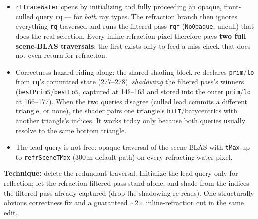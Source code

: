\documentclass[11pt,a4paper]{article}
\begin{document}
\begin{itemize}
    \item \texttt{rtTraceWater} opens by initializing and fully proceeding an opaque, front-culled query \texttt{rq} --- for \emph{both} ray types. The refraction branch then ignores everything \texttt{rq} traversed and runs the filtered pass \texttt{rqf} (\texttt{NoOpaque}, uncull) that does the real selection. Every inline refraction pixel therefore pays \textbf{two full scene-BLAS traversals}; the first exists only to feed a miss check that does not even return for refraction.
    \item Correctness hazard riding along: the shared shading block re-declares \texttt{prim}/\texttt{lo} from \texttt{rq}'s committed state (277--278), \emph{shadowing} the filtered pass's winners (\texttt{bestPrimS}/\texttt{bestLoS}, captured at 148--163 and stored into the outer \texttt{prim}/\texttt{lo} at 166--177). When the two queries disagree (culled lead commits a different triangle, or none), the shader pairs one triangle's \texttt{hitT}/barycentrics with another triangle's indices. It works today only because both queries usually resolve to the same bottom triangle.
    \item The lead query is not free: opaque traversal of the scene BLAS with \texttt{tMax} up to \texttt{refrSceneTMax} (300\,m default path) on every refracting water pixel.
\end{itemize}

\textbf{Technique:} delete the redundant traversal. Initialize the lead query only for reflection; let the refraction filtered pass stand alone, and shade from the indices the filtered pass already captured (drop the shadowing re-reads). One structurally obvious correctness fix and a guaranteed $\sim$2$\times$ inline-refraction cut in the same edit.
\end{document}
